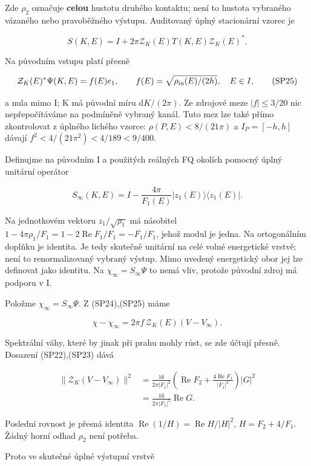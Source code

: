\documentclass[11pt,a4paper]{article}
\theoremstyle{remark}\newtheorem{remark}[theorem]{Poznámka}
\numberwithin{equation}{section}
\begin{document}
Zde \(\rho_2\) označuje \textbf{celou} hustotu druhého kontaktu; není to
hustota vybraného vázaného nebo pravoběžného výstupu. Auditovaný úplný
stacionární vzorec je

\[
S(K,E)=I+2\pi\mathcal Z_K(E)T(K,E)\mathcal Z_K(E)^*.
\tag{SP24}
\]

Na původním vstupu platí přesně

\[
\mathcal Z_K(E)^*\Psi(K,E)=f(E)e_1,
\qquad f(E)=\sqrt{\rho_{\rm in}(E)/(2h)},\quad E\in I,
\tag{SP25}
\]

a nula mimo I; K má původní míru \(\mathrm dK/(2\pi)\). Ze zdrojové meze
\(|f|\le3/20\) nic nepřepočítáváme na podmíněně vybraný kanál. Tuto mez
lze také přímo zkontrolovat z úplného lichého vzorce:
\(\rho(P,E)<8/(21\pi)\) a \(I_P=[-h,h]\) dávají
\(f^2<4/(21\pi^2)<4/189<9/400\).

Definujme na původním I a použitých reálných FQ okolích pomocný úplný
unitární operátor

\[
S_\infty(K,E)=I-\frac{4\pi}{F_1(E)}|z_1(E)\rangle\langle z_1(E)|.
\tag{SP26}
\]

Na jednotkovém vektoru \(z_1/\sqrt{\rho_1}\) má násobitel
\(1-4\pi\rho_1/F_1=1-2\operatorname{Re}F_1/F_1 =-\overline{F_1}/F_1\),
jehož modul je jedna. Na ortogonálním doplňku je identita. Je tedy
skutečně unitární na celé volné energetické vrstvě; není to
renormalizovaný vybraný výstup. Mimo uvedený energetický obor jej lze
definovat jako identitu. Na \(\chi_\infty=S_\infty\Psi\) to nemá vliv,
protože původní zdroj má podporu v I.

Položme \(\chi_\infty=S_\infty\Psi\). Z (SP24),(SP25) máme

\[
\chi-\chi_\infty
=2\pi f\,\mathcal Z_K(E)(V-V_\infty).
\tag{SP27}
\]

Spektrální váhy, které by jinak při prahu mohly růst, se zde účtují
přesně. Dosazení (SP22),(SP23) dává

\[
\begin{aligned}
\|\mathcal Z_K(V-V_\infty)\|^2
&=\frac{16}{2\pi|F_1|^2}
\left(\operatorname{Re}F_2+
\frac{4\operatorname{Re}F_1}{|F_1|^2}\right)|G|^2\\
&=\frac{16}{2\pi|F_1|^2}\operatorname{Re}G.
\end{aligned}
\tag{SP28}
\]

Poslední rovnost je přesná identita
\(\operatorname{Re}(1/H)=\operatorname{Re}H/|H|^2\), \(H=F_2+4/F_1\).
Žádný horní odhad \(\rho_2\) není potřeba.

Proto ve skutečné úplné výstupní vrstvě
\end{document}
